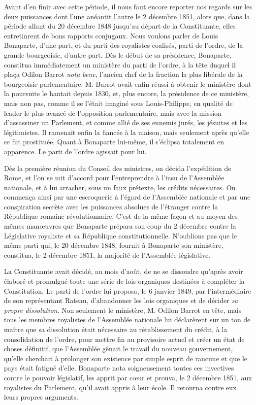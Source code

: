 \documentclass[french,twoside]{book} %
\begin{document}
Avant d’en finir avec cette période, il nous faut encore reporter nos regards sur les deux puissances dont l’une anéantit l’autre le 2 décembre 1851, alors que, dans la période allant du 20 décembre 1848 jusqu’au départ de la Constituante, elles entretinrent de bons rapports conjugaux. Nous voulons parler de Louis Bonaparte, d’une part, et du parti des royalistes coalisés, parti de l’ordre, de la grande bourgeoisie, d’autre part. Dès le début de sa présidence, Bonaparte, constitua immédiatement un ministère du parti de l’ordre, à la tête duquel il plaça Odilon Barrot \emph{nota bene}, l’ancien chef de la fraction la plus libérale de la bourgeoisie parlementaire. M. Barrot avait enfin réussi à obtenir le ministère dont la poursuite le hantait depuis 1830, et, plus encore, la présidence de ce ministère, mais non pas, comme il se l’était imaginé sous Louis-Philippe, en qualité de leader le plus avancé de l’opposition parlementaire, mais avec la mission d’assassiner un Parlement, et comme allié de ses ennemis jurés, les jésuites et les légitimistes. Il ramenait enfin la fiancée à la maison, mais seulement après qu’elle se fut prostituée. Quant à Bonaparte lui-même, il s’éclipsa totalement en apparence. Le parti de l’ordre agissait pour lui.\par
Dès la première réunion du Conseil des ministres, on décida l’expédition de Rome, et l’on se mit d’accord pour l’entreprendre à l’insu de l’Assemblée nationale, et à lui arracher, sous un faux prétexte, les crédits nécessaires. On commença ainsi par une escroquerie à l’égard de l’Assemblée nationale et par une conspiration secrète avec les puissances absolues de l’étranger contre la République romaine révolutionnaire. C’est de la même façon et au moyen des mêmes manœuvres que Bonaparte prépara son coup du 2 décembre contre la Législative royaliste et sa République constitutionnelle. N’oublions pas que le même parti qui, le 20 décembre 1848, fournit à Bonaparte son ministère, constitua, le 2 décembre 1851, la majorité de l’Assemblée législative.\par
La Constituante avait décidé, au mois d’août, de ne se dissoudre qu’après avoir élaboré et promulgué toute une série de lois organiques destinées à compléter la Constitution. Le parti de l’ordre lui proposa, le 6 janvier 1849, par l’intermédiaire de son représentant Rateau, d’abandonner les lois organiques et de décider \emph{sa propre dissolution}. Non seulement le ministère, M. Odilon Barrot en tête, mais tous les membres royalistes de l’Assemblée nationale lui déclarèrent sur un ton de maître que sa dissolution était nécessaire au rétablissement du crédit, à la consolidation de l’ordre, pour mettre fin au provisoire actuel et créer un état de choses définitif, que l’Assemblée gênait le travail du nouveau gouvernement, qu’elle cherchait à prolonger son existence par simple esprit de rancune et que le pays était fatigué d’elle. Bonaparte nota soigneusement toutes ces invectives contre le pouvoir législatif, les apprit par cœur et prouva, le 2 décembre 1851, aux royalistes du Parlement, qu’il avait appris à leur école. Il retourna contre eux leurs propres arguments.\par
\end{document}
